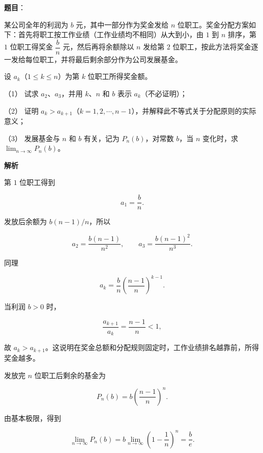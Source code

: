 \begin{answer}

\textbf{题目}：

某公司全年的利润为 $b$ 元，其中一部分作为奖金发给 $n$ 位职工。奖金分配方案如下：首先将职工按工作业绩（工作业绩均不相同）从大到小，由 $1$ 到 $n$ 排序，第 $1$ 位职工得奖金 $\dfrac bn$ 元，然后再将余额除以 $n$ 发给第 $2$ 位职工，按此方法将奖金逐一发给每位职工，并将最后剩余部分作为公司发展基金。

设 $a_k$（$1\le k\le n$）为第 $k$ 位职工所得奖金额。

（1） 试求 $a_2\text{、}a_3$，并用 $k\text{、}n$ 和 $b$ 表示 $a_k$（不必证明）；

（2） 证明 $a_k>a_{k+1}$（$k=1,2,\cdots,n-1$），并解释此不等式关于分配原则的实际意义；

（3） 发展基金与 $n$ 和 $b$ 有关，记为 $P_n(b)$，对常数 $b$，当 $n$ 变化时，求 $\displaystyle\lim_{n\to\infty}P_n(b)$。

\textbf{解析}


第 $1$ 位职工得到

\nopagebreak[4]
\[
a_1=\frac bn.
\]

发放后余额为 $b(n-1)/n$，所以

\nopagebreak[4]
\[
a_2=\frac{b(n-1)}{n^2},\qquad
a_3=\frac{b(n-1)^2}{n^3}.
\]

同理

\nopagebreak[4]
\[
a_k=\frac bn\left(\frac{n-1}{n}\right)^{k-1}.
\]


当利润 $b>0$ 时，

\nopagebreak[4]
\[
\frac{a_{k+1}}{a_k}=\frac{n-1}{n}<1,
\]

故 $a_k>a_{k+1}$。这说明在奖金总额和分配规则固定时，工作业绩排名越靠前，所得奖金越多。


发放完 $n$ 位职工后剩余的基金为

\nopagebreak[4]
\[
P_n(b)
=b\left(\frac{n-1}{n}\right)^n.
\]

由基本极限，得到

\nopagebreak[4]
\[
\lim_{n\to\infty}P_n(b)
=b\lim_{n\to\infty}\left(1-\frac1n\right)^n
=\frac be.
\]




\end{answer}

